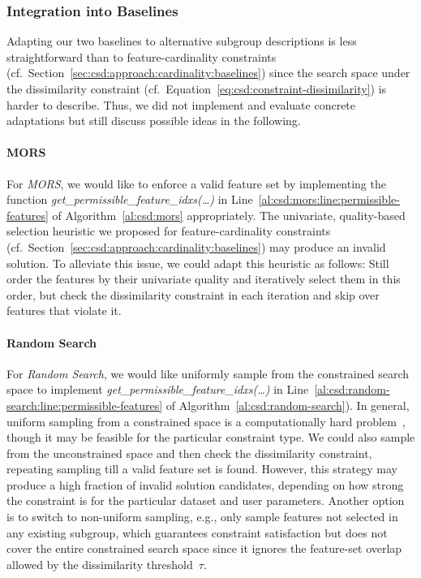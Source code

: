 \documentclass{article}
\theoremstyle{definition}
\begin{document}
\subsubsection{Integration into Baselines}
\label{sec:csd:approach:alternatives:baselines}

Adapting our two baselines to alternative subgroup descriptions is less straightforward than to feature-cardinality constraints (cf.~Section~\ref{sec:csd:approach:cardinality:baselines}) since the search space under the dissimilarity constraint (cf.~Equation~\ref{eq:csd:constraint-dissimilarity}) is harder to describe.
Thus, we did not implement and evaluate concrete adaptations but still discuss possible ideas in the following.

\paragraph{MORS}

For \emph{MORS}, we would like to enforce a valid feature set by implementing the function \emph{get\_permissible\_feature\_idxs(\dots)} in Line~\ref{al:csd:mors:line:permissible-features} of Algorithm~\ref{al:csd:mors} appropriately.
The univariate, quality-based selection heuristic we proposed for feature-cardinality constraints (cf.~Section~\ref{sec:csd:approach:cardinality:baselines}) may produce an invalid solution.
To alleviate this issue, we could adapt this heuristic as follows:
Still order the features by their univariate quality and iteratively select them in this order, but check the dissimilarity constraint in each iteration and skip over features that violate it.

\paragraph{Random Search}

For \emph{Random Search}, we would like uniformly sample from the constrained search space to implement \emph{get\_permissible\_feature\_idxs(\dots)} in Line~\ref{al:csd:random-search:line:permissible-features} of Algorithm~\ref{al:csd:random-search}).
In general, uniform sampling from a constrained space is a computationally hard problem~\cite{ermon2012uniform}, though it may be feasible for the particular constraint type.
We could also sample from the unconstrained space and then check the dissimilarity constraint, repeating sampling till a valid feature set is found.
However, this strategy may produce a high fraction of invalid solution candidates, depending on how strong the constraint is for the particular dataset and user parameters.
Another option is to switch to non-uniform sampling, e.g., only sample features not selected in any existing subgroup, which guarantees constraint satisfaction but does not cover the entire constrained search space since it ignores the feature-set overlap allowed by the dissimilarity threshold~$\tau$.
\end{document}
